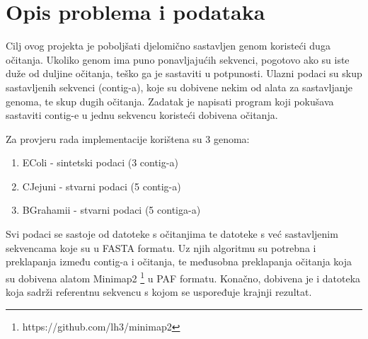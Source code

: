 \chapter{Opis problema i podataka}
Cilj ovog projekta je poboljšati djelomično sastavljen genom koristeći duga očitanja. Ukoliko genom ima puno ponavljajućih sekvenci, pogotovo ako su iste duže od duljine očitanja, teško ga je sastaviti u potpunosti. Ulazni podaci su skup sastavljenih sekvenci (contig-a), koje su dobivene nekim od alata za sastavljanje genoma, te skup dugih očitanja. Zadatak je napisati program koji pokušava sastaviti contig-e u jednu sekvencu koristeći dobivena očitanja.

Za provjeru rada implementacije korištena su 3 genoma:
\begin{enumerate}
\item EColi - sintetski podaci (3 contig-a)
\item CJejuni - stvarni podaci (5 contig-a)
\item BGrahamii - stvarni podaci (5 contiga-a)
\end{enumerate}

Svi podaci se sastoje od datoteke s očitanjima te datoteke s već sastavljenim sekvencama koje su u FASTA formatu. Uz njih algoritmu su potrebna i preklapanja između contig-a i očitanja, te međusobna preklapanja očitanja koja su dobivena alatom Minimap2 \footnote{https://github.com/lh3/minimap2} u PAF formatu. Konačno, dobivena je i datoteka koja sadrži referentnu sekvencu s kojom se uspoređuje krajnji rezultat.